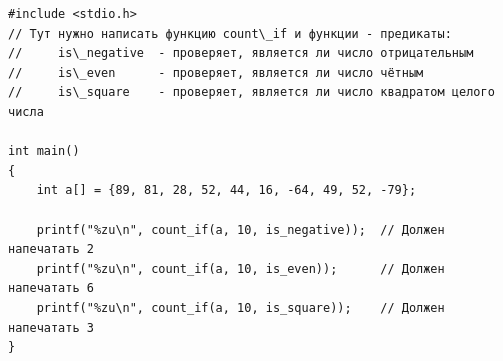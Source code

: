 \documentclass[10pt]{article}
\begin{document}
\begin{lstlisting}
#include <stdio.h>
// Тут нужно написать функцию count\_if и функции - предикаты:
//     is\_negative  - проверяет, является ли число отрицательным
//     is\_even      - проверяет, является ли число чётным
//     is\_square    - проверяет, является ли число квадратом целого числа

int main()
{
    int a[] = {89, 81, 28, 52, 44, 16, -64, 49, 52, -79};
    
    printf("%zu\n", count_if(a, 10, is_negative));  // Должен напечатать 2
    printf("%zu\n", count_if(a, 10, is_even));      // Должен напечатать 6
    printf("%zu\n", count_if(a, 10, is_square));    // Должен напечатать 3
}

\end{lstlisting}

\end{document}
